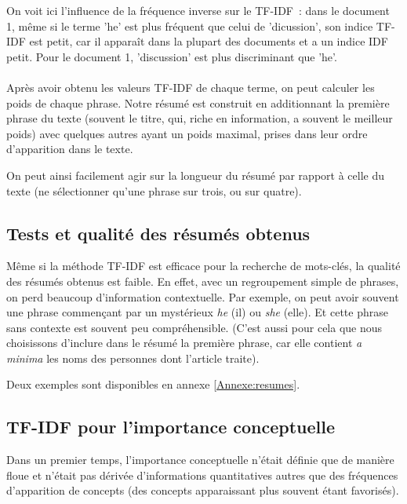 \documentclass[a4paper, 12pt]{article}
\begin{document}
On voit ici l'influence de la fréquence inverse sur le TF-IDF~: dans le document 1, même si le terme 'he' est plus fréquent que celui de 'dicussion', son indice TF-IDF est petit, car il apparaît dans la plupart des documents et a un indice IDF petit. Pour le document 1, 'discussion' est plus discriminant que 'he'.

\paragraph{}
Après avoir obtenu les valeurs TF-IDF de chaque terme, on peut calculer les poids de chaque phrase. Notre résumé est construit en additionnant la première phrase du texte (souvent le titre, qui, riche en information, a souvent le meilleur poids) avec quelques autres ayant un poids maximal, prises dans leur ordre d'apparition dans le texte.

On peut ainsi facilement agir sur la longueur du résumé par rapport à celle du texte (ne sélectionner qu'une phrase sur trois, ou sur quatre).

\subsection{Tests et qualité des résumés obtenus}

Même si la méthode TF-IDF est efficace pour la recherche de mots-clés, la qualité des résumés obtenus est faible. En effet, avec un regroupement simple de phrases, on perd beaucoup d'information contextuelle. Par exemple, on peut avoir souvent une phrase commençant par un mystérieux \textit{he} (il) ou \textit{she} (elle). Et cette phrase sans contexte est souvent peu compréhensible. (C'est aussi pour cela que nous choisissons d'inclure dans le résumé la première phrase, car elle contient \textit{a minima} les noms des personnes dont l'article traite).

Deux exemples sont disponibles en annexe \ref{Annexe:resumes}.


\subsection{TF-IDF pour l'importance conceptuelle}

Dans un premier temps, l'importance conceptuelle n'était définie que de manière floue et n'était pas dérivée d'informations quantitatives autres que des fréquences d'apparition de concepts (des concepts apparaissant plus souvent étant favorisés).
\end{document}
